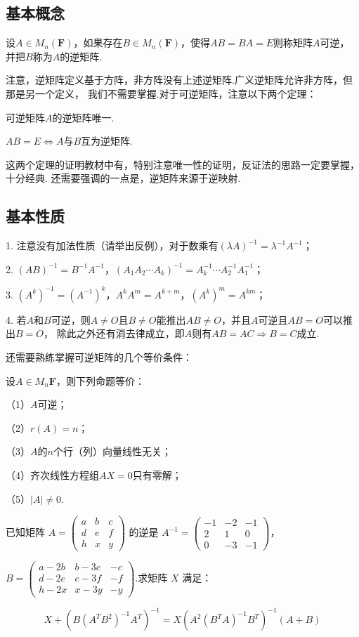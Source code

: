 \subsection{基本概念}
\begin{definition}
	设$A \in M_n(\mathbf{F})$，如果存在$B \in M_n(\mathbf{F})$，使得$AB=BA=E$则称矩阵$A$可逆，
	并把$B$称为$A$的逆矩阵.
\end{definition}
注意，逆矩阵定义基于方阵，非方阵没有上述逆矩阵.广义逆矩阵允许非方阵，但那是另一个定义，
我们不需要掌握.对于可逆矩阵，注意以下两个定理：
\begin{theorem}
	可逆矩阵$A$的逆矩阵唯一.
\end{theorem}
\begin{theorem}
	$AB=E \iff A$与$B$互为逆矩阵.
\end{theorem}
这两个定理的证明教材中有，特别注意唯一性的证明，反证法的思路一定要掌握，十分经典.
还需要强调的一点是，逆矩阵来源于逆映射.
\subsection{基本性质}
1. 注意没有加法性质（请举出反例），对于数乘有$(\lambda A)^{-1}=\lambda^{-1}A^{-1}$；

2. $(AB)^{-1}=B^{-1}A^{-1}$，$(A_1A_2\cdots A_k)^{-1}=A_k^{-1}\cdots A_2^{-1}A_1^{-1}$；

3. $(A^k)^{-1}=(A^{-1})^k$，$A^kA^m=A^{k+m}$，$(A^k)^m=A^{km}$；

4. 若$A$和$B$可逆，则$A\neq O$且$B\neq O$能推出$AB\neq O$，并且$A$可逆且$AB=O$可以推出$B=O$，
除此之外还有消去律成立，即$A$则有$AB=AC \Rightarrow B=C$成立.

还需要熟练掌握可逆矩阵的几个等价条件：
\begin{theorem}
	设$A \in M_n{\mathbf{F}}$，则下列命题等价：

	\textup{（1）}$A$可逆；
	
	\textup{（2）}$r(A)=n$；
	
	\textup{（3）}$A$的$n$个行（列）向量线性无关；
	
	\textup{（4）}齐次线性方程组$AX=0$只有零解；
	
	\textup{（5）}$|A|\neq 0$.
\end{theorem}
\begin{example}
	已知矩阵 $A=\begin{pmatrix}a & b & c \\ d & e & f \\ h & x & y\end{pmatrix}$ 的逆是 $A^{-1}=\begin{pmatrix}-1 & -2 & -1 \\ 2 & 1 & 0 \\ 0 & -3 & -1\end{pmatrix}$，

$B=\begin{pmatrix}a-2b & b-3c & -c \\ d-2e & e-3f & -f \\ h-2x & x-3y & -y\end{pmatrix}$.求矩阵 $X$ 满足：

$$X+(B(A^TB^2)^{-1}A^T)^{-1}=X(A^2(B^TA)^{-1}B^T)^{-1}(A+B)$$
\end{example}

